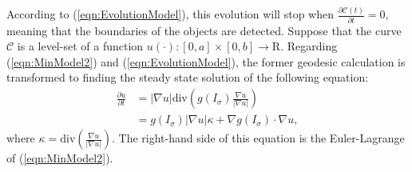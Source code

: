 According to (\ref{eqn:EvolutionModel}), this evolution will stop when $\frac{\partial \mathcal{C}(t)}{\partial t} = 0$, meaning that the boundaries of the objects are detected.
Suppose that the curve $\mathcal{C}$ is a level-set of a function $u(\cdot):[0,a] \times [0,b] \rightarrow \mathrm{R}$.
Regarding (\ref{eqn:MinModel2}) and (\ref{eqn:EvolutionModel}), the former geodesic calculation is transformed to finding the steady state solution of the following equation:
\begin{equation}
\label{eqn:LevelSetModel}
\begin{split}
\frac{\partial u}{\partial t} & = |\nabla u| \textrm{div} \left(g(I_{\sigma}) \frac{\nabla u}{|\nabla u|}\right) \\
                              & = g(I_{\sigma}) |\nabla u| \kappa + \nabla g(I_{\sigma}) \cdot \nabla u,
\end{split}
\end{equation}
where $\kappa = \textrm{div}\left(\frac{\nabla u}{|\nabla u|}\right)$.
The right-hand side of this equation is the Euler-Lagrange of (\ref{eqn:MinModel2}).

